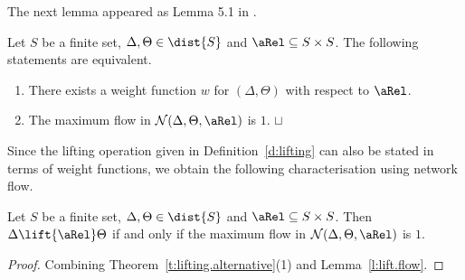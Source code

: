 \documentclass{article}
\newcommand{\temporaryremove}[1]{}
\def \CN{{\cal N}}
\def\squareforqed{\hbox{\rlap{$\sqcap$}$\sqcup$}}
\def\qed{\ifmmode\squareforqed\else{\unskip\nobreak\hfil
\penalty50\hskip1em\null\nobreak\hfil\squareforqed
\parfillskip=0pt\finalhyphendemerits=0\endgraf}\fi}
\begin{document}
\temporaryremove{ \begin{figure}
\psset{unit=0.8cm}
\begin{center}
\rput(-5.5,-1){\rnode{source}{\qdisk(0,0){2pt}}}
\rput(5.5,-1){\rnode{sink}{\qdisk(0,0){2pt}}}
\uput[l](-5.5,-1){$\bot$} \uput[r](5.5,-1){$\top$}
\rput(-2.5,1){\rnode{s1}{\qdisk(0,0){2pt}}} \uput[l](-2.5,1){$s_1$}
\rput(-2.5,-0.5){\rnode{s2}{\qdisk(0,0){2pt}}}
\uput[l](-2.5,-0.25){$s_2$} \rput(-2.5,-2){$\vdots$}
\rput(-2.5,-3.5){\rnode{sn}{\qdisk(0,0){2pt}}}
\uput[l](-2.5,-3.5){$s_n$}
\rput(2.5,1){\rnode{t1}{\qdisk(0,0){2pt}}} \uput[r](2.5,1){$s'_1$}
\rput(2.5,-0.5){\rnode{t2}{\qdisk(0,0){2pt}}}
\uput[r](2.5,-0.25){$s'_2$} \rput(2.5,-2){$\vdots$}
\uput[r](2.5,-3.5){$s'_n$}
\rput(2.5,-3.5){\rnode{tn}{\qdisk(0,0){2pt}}}
\ncline[nodesep=2mm]{->}{s1}{t1}\aput{:U}{$c_{11}$}
\ncline[nodesep=2mm]{->}{s1}{t2}\aput{:U}{$c_{12}$}
\ncline[nodesep=2mm]{->}{s1}{tn}\aput{:U}{$c_{1n}$}
\ncline[nodesep=2mm]{->}{s2}{t2}\aput{:U}{$c_{22}$}
\ncline[nodesep=2mm]{->}{s2}{tn}\bput{:U}{$c_{2n}$}
\ncline[nodesep=2mm]{->}{sn}{tn}\bput{:U}{$c_{nn}$}
\ncline[nodesep=2mm]{->}{source}{s1}\aput{:U}{$\Delta(s_1)$}
\ncline[nodesep=2mm]{->}{source}{s2}\bput{:U}{$\Delta(s_2)$}
\ncline[nodesep=2mm]{->}{source}{sn}\bput{:U}{$\Delta(s_n)$}
\ncline[nodesep=2mm]{->}{t1}{sink}\aput{:U}{$\Theta(s_1)$}
\ncline[nodesep=2mm]{->}{t2}{sink}\bput{:U}{$\Theta(s_2)$}
\ncline[nodesep=2mm]{->}{tn}{sink}\bput{:U}{$\Theta(s_n)$}
\uput[d](0,-4.5){$c_{ij}=1$ for all $i,j$}
\end{center}\vskip 4cm
\caption{The network $\CN(\Delta,\Theta,\aRel)$}\label{f:network}
\end{figure}
}
The next lemma appeared as Lemma 5.1 in \cite{BEM00}.
\begin{lemma}\label{l:lift.flow}
Let $S$ be a finite set, $\Delta,\Theta\in\dist{S}$ and
$\aRel\subseteq S\times S$. The following statements are equivalent.
\begin{enumerate}
\item There exists a weight function $w$ for $(\Delta,\Theta)$ with
  respect to $\aRel$.
\item The maximum flow in $\CN(\Delta,\Theta,\aRel)$ is $1$.
\hfill\qed
\end{enumerate}
\end{lemma}

Since the lifting operation given in Definition~\ref{d:lifting} can
also be stated in terms of weight functions, we obtain the following
characterisation using network flow.
\begin{theorem}\label{t:lift.flow}
Let $S$ be a finite set, $\Delta,\Theta\in\dist{S}$ and
$\aRel\subseteq S\times S$. Then $\Delta\lift{\aRel}\Theta$ if and
only if the maximum flow in
  $\CN(\Delta,\Theta,\aRel)$ is $1$.
\end{theorem}
\begin{proof}
Combining Theorem~\ref{t:lifting.alternative}(1) and
Lemma~\ref{l:lift.flow}.
\end{proof}
\end{document}
